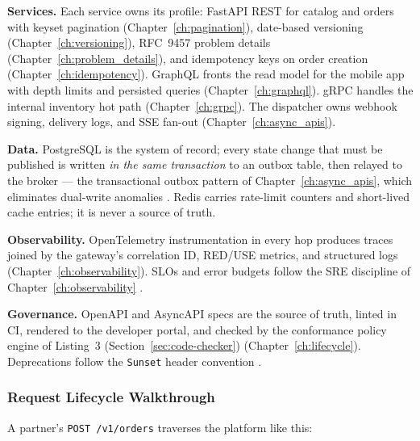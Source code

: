\textbf{Services.} Each service owns its profile: FastAPI REST for catalog
and orders with keyset pagination (Chapter~\ref{ch:pagination}), date-based
versioning (Chapter~\ref{ch:versioning}), RFC~9457 problem details
\cite{rfc9457} (Chapter~\ref{ch:problem_details}), and idempotency keys on
order creation (Chapter~\ref{ch:idempotency}). GraphQL fronts the read model
for the mobile app with depth limits and persisted queries
(Chapter~\ref{ch:graphql}). gRPC handles the internal inventory hot path
(Chapter~\ref{ch:grpc}). The dispatcher owns webhook signing, delivery logs,
and SSE fan-out (Chapter~\ref{ch:async_apis}).

\textbf{Data.} PostgreSQL is the system of record; every state change that
must be published is written \emph{in the same transaction} to an outbox
table, then relayed to the broker --- the transactional outbox pattern of
Chapter~\ref{ch:async_apis}, which eliminates dual-write anomalies
\cite{kleppmann2017ddia}. Redis carries rate-limit counters and short-lived
cache entries; it is never a source of truth.

\textbf{Observability.} OpenTelemetry instrumentation in every hop produces
traces joined by the gateway's correlation ID, RED/USE metrics, and
structured logs \cite{opentelemetrydocs}
(Chapter~\ref{ch:observability}). SLOs and error budgets follow the SRE
discipline of Chapter~\ref{ch:observability} \cite{beyer2016sre}.

\textbf{Governance.} OpenAPI and AsyncAPI specs are the source of truth,
linted in CI, rendered to the developer portal, and checked by the
conformance policy engine of Listing~3 (Section~\ref{sec:code-checker})
\cite{openapi31,asyncapi} (Chapter~\ref{ch:lifecycle}). Deprecations follow
the \texttt{Sunset} header convention \cite{rfc8594}.

\subsubsection{Request Lifecycle Walkthrough}

A partner's \texttt{POST /v1/orders} traverses the platform like this:

